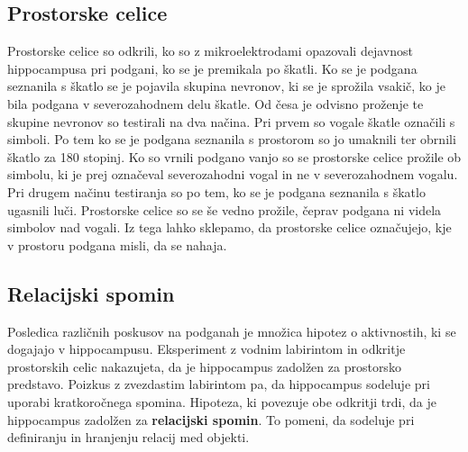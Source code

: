 \documentclass[10pt,a4paper]{article}
\begin{document}
\subsection{Prostorske celice}
Prostorske celice so odkrili, ko so z mikroelektrodami opazovali dejavnost hippocampusa pri podgani, ko se je premikala po škatli. Ko se je podgana seznanila s škatlo se je pojavila skupina nevronov, ki se je sprožila vsakič, ko je bila podgana v severozahodnem delu škatle. Od česa je odvisno proženje te skupine nevronov so testirali na dva načina. Pri prvem so vogale škatle označili s simboli. Po tem ko se je podgana seznanila s prostorom so jo umaknili ter obrnili škatlo za 180 stopinj. Ko so vrnili podgano vanjo so se prostorske celice prožile ob simbolu, ki je prej označeval severozahodni vogal in ne v severozahodnem vogalu. Pri drugem načinu testiranja so po tem, ko se je podgana seznanila s škatlo ugasnili luči. Prostorske celice so se še vedno prožile, čeprav podgana ni videla simbolov nad vogali. Iz tega lahko sklepamo, da prostorske celice označujejo, kje v prostoru podgana misli, da se nahaja.

\subsection{Relacijski spomin}
Posledica različnih poskusov na podganah je množica hipotez o aktivnostih, ki se dogajajo v hippocampusu. Eksperiment z vodnim labirintom in odkritje prostorskih celic nakazujeta, da je hippocampus zadolžen za prostorsko predstavo. Poizkus z zvezdastim labirintom pa, da hippocampus sodeluje pri uporabi kratkoročnega spomina. Hipoteza, ki povezuje obe odkritji trdi, da je hippocampus zadolžen za \textbf{relacijski spomin}. To pomeni, da sodeluje pri definiranju in hranjenju relacij med objekti.
\end{document}
